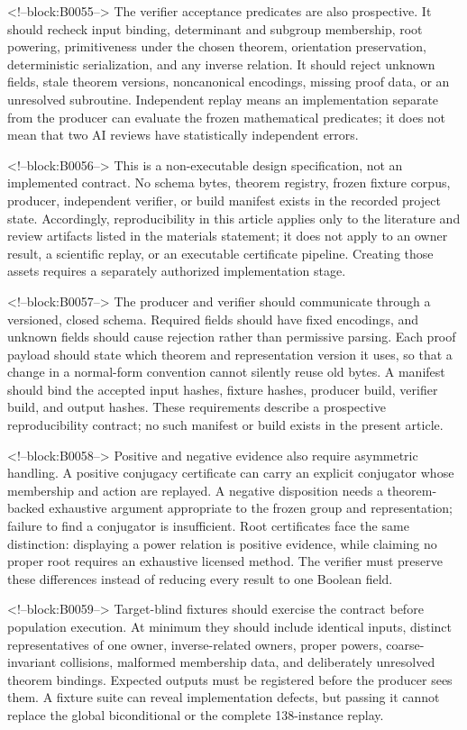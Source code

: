 \documentclass[11pt]{article}
\begin{document}
<!--block:B0055-->
The verifier acceptance predicates are also prospective. It should
recheck input binding, determinant and subgroup membership, root
powering, primitiveness under the chosen theorem, orientation
preservation, deterministic serialization, and any inverse relation. It
should reject unknown fields, stale theorem versions, noncanonical
encodings, missing proof data, or an unresolved subroutine. Independent
replay means an implementation separate from the producer can evaluate
the frozen mathematical predicates; it does not mean that two AI reviews
have statistically independent errors.

<!--block:B0056-->
This is a non-executable design specification, not an implemented contract.
No schema bytes, theorem registry, frozen fixture corpus, producer, independent
verifier, or build manifest exists in the recorded project state. Accordingly,
reproducibility in this article applies only to the literature and review
artifacts listed in the materials statement; it does not apply to an owner
result, a scientific replay, or an executable certificate pipeline. Creating
those assets requires a separately authorized implementation stage.

<!--block:B0057-->
The producer and verifier should communicate through a versioned,
closed schema. Required fields should have fixed encodings, and unknown
fields should cause rejection rather than permissive parsing. Each proof
payload should state which theorem and representation version it uses,
so that a change in a normal-form convention cannot silently reuse old
bytes. A manifest should bind the accepted input hashes, fixture hashes,
producer build, verifier build, and output hashes. These requirements
describe a prospective reproducibility contract; no such manifest or
build exists in the present article.

<!--block:B0058-->
Positive and negative evidence also require asymmetric handling. A
positive conjugacy certificate can carry an explicit conjugator whose
membership and action are replayed. A negative disposition needs a
theorem-backed exhaustive argument appropriate to the frozen group and
representation; failure to find a conjugator is insufficient. Root
certificates face the same distinction: displaying a power relation is
positive evidence, while claiming no proper root requires an exhaustive
licensed method. The verifier must preserve these differences instead
of reducing every result to one Boolean field.

<!--block:B0059-->
Target-blind fixtures should exercise the contract before population
execution. At minimum they should include identical inputs, distinct
representatives of one owner, inverse-related owners, proper powers,
coarse-invariant collisions, malformed membership data, and deliberately
unresolved theorem bindings. Expected outputs must be registered before
the producer sees them. A fixture suite can reveal implementation
defects, but passing it cannot replace the global biconditional or the
complete 138-instance replay.
\end{document}
